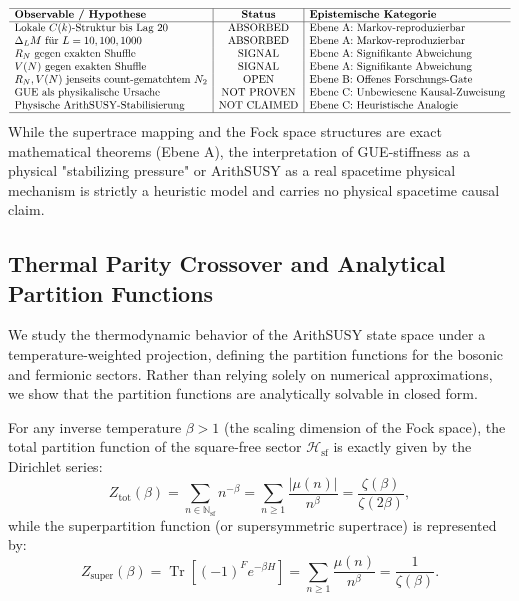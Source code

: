 \documentclass[11pt,a4paper]{article}
\theoremstyle{definition}
\begin{document}
	\begin{equation}
		\begin{array}{l|c|l}
			\hline
			\textbf{Observable / Hypothese} & \textbf{Status} & \textbf{Epistemische Kategorie} \\
			\hline
			\text{Lokale } C(k) \text{-Struktur bis Lag 20} & \mathrm{ABSORBED} & \text{Ebene A: Markov-reproduzierbar} \\
			\Delta_L M \text{ für } L = 10, 100, 1000 & \mathrm{ABSORBED} & \text{Ebene A: Markov-reproduzierbar} \\
			R_N \text{ gegen exakten Shuffle} & \mathrm{SIGNAL} & \text{Ebene A: Signifikante Abweichung} \\
			V(N) \text{ gegen exakten Shuffle} & \mathrm{SIGNAL} & \text{Ebene A: Signifikante Abweichung} \\
			R_N, V(N) \text{ jenseits count-gematchtem } N_2 & \mathrm{OPEN} & \text{Ebene B: Offenes Forschungs-Gate} \\
			\text{GUE als physikalische Ursache} & \mathrm{NOT\ PROVEN} & \text{Ebene C: Unbewiesene Kausal-Zuweisung} \\
			\text{Physische ArithSUSY-Stabilisierung} & \mathrm{NOT\ CLAIMED} & \text{Ebene C: Heuristische Analogie} \\
			\hline
		\end{array}
	\end{equation}
	While the supertrace mapping and the Fock space structures are exact mathematical theorems (Ebene A), the interpretation of GUE-stiffness as a physical "stabilizing pressure" or ArithSUSY as a real spacetime physical mechanism is strictly a heuristic model and carries no physical spacetime causal claim.
	
	\subsection{Thermal Parity Crossover and Analytical Partition Functions}
	We study the thermodynamic behavior of the ArithSUSY state space under a temperature-weighted projection, defining the partition functions for the bosonic and fermionic sectors. Rather than relying solely on numerical approximations, we show that the partition functions are analytically solvable in closed form.
	
	For any inverse temperature $\beta > 1$ (the scaling dimension of the Fock space), the total partition function of the square-free sector $\mathcal{H}_{\text{sf}}$ is exactly given by the Dirichlet series:
	\begin{equation}
		Z_{\text{tot}}(\beta) = \sum_{n \in \mathbb{N}_{\text{sf}}} n^{-\beta} = \sum_{n \ge 1} \frac{|\mu(n)|}{n^\beta} = \frac{\zeta(\beta)}{\zeta(2\beta)},
	\end{equation}
	while the superpartition function (or supersymmetric supertrace) is represented by:
	\begin{equation}
		Z_{\text{super}}(\beta) = \operatorname{Tr}\left[(-1)^F e^{-\beta H}\right] = \sum_{n \ge 1} \frac{\mu(n)}{n^\beta} = \frac{1}{\zeta(\beta)}.
	\end{equation}
	
\end{document}
